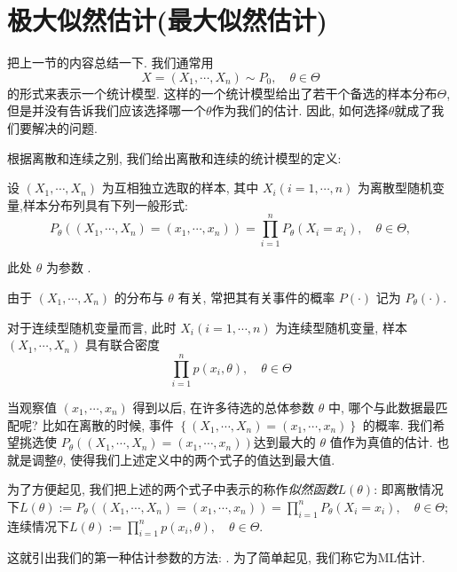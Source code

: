 \section{极大似然估计(最大似然估计)}

把上一节的内容总结一下. 我们通常用
$$
X=\left(X_1, \cdots, X_n\right) \sim P_0, \quad \theta \in \Theta
$$
的形式来表示一个统计模型. 这样的一个统计模型给出了若干个备选的样本分布$\Theta$, 但是并没有告诉我们应该选择哪一个$\theta$作为我们的估计. 因此, 如何选择$\theta$就成了我们要解决的问题. 

根据离散和连续之别, 我们给出离散和连续的统计模型的定义:

\begin{definition}
    \label{def:mle1}
    设 $\left(X_1, \cdots, X_n\right)$ 为互相独立选取的样本, 其中 $X_i(i=1, \cdots, n)$ 为离散型随机变量,样本分布列具有下列一般形式:
$$
P_\theta\left(\left(X_1, \cdots, X_n\right)=\left(x_1, \cdots, x_n\right)\right)=\prod_{i=1}^n P_\theta\left(X_i=x_i\right), \quad \theta \in \Theta,
$$

此处 $\theta$ 为参数 . 
\end{definition}

由于 $\left(X_1, \cdots, X_n\right)$ 的分布与 $\theta$ 有关, 常把其有关事件的概率 $P(\cdot)$ 记为 $P_\theta(\cdot)$.

\begin{definition}
    \label{def:mle2}
    对于连续型随机变量而言, 此时 $X_i(i=1, \cdots, n)$ 为连续型随机变量, 样本 $\left(X_1, \cdots, X_n\right)$ 具有联合密度
$$
\prod_{i=1}^n p\left(x_i, \theta\right), \quad \theta \in \Theta
$$
\end{definition}

当观察值 $\left(x_1, \cdots, x_n\right)$ 得到以后, 在许多待选的总体参数 $\theta$ 中, 哪个与此数据最匹配呢? 比如在离散的时候, 事件 $\left\{\left(X_1, \cdots, X_n\right)=\left(x_1, \cdots\right., \left.x_n\right)\right\}$ 的概率. 我们希望挑选使 $P_\theta\left(\left(X_1, \cdots, X_n\right)=\left(x_1, \cdots, x_n\right)\right)$达到最大的 $\theta$ 值作为真值的估计. 也就是调整$\theta$, 使得我们上述定义中的两个式子的值达到最大值. 

为了方便起见, 我们把上述的两个式子中表示的称作\emph{似然函数}$L(\theta)$: 即离散情况下$L(\theta):=P_\theta\left(\left(X_1, \cdots, X_n\right)=\left(x_1, \cdots, x_n\right)\right)=\prod_{i=1}^n P_\theta\left(X_i=x_i\right), \quad \theta \in \Theta;$连续情况下$L(\theta):=\prod_{i=1}^n p\left(x_i, \theta\right), \quad \theta \in \Theta$.

这就引出我们的第一种估计参数的方法: . 为了简单起见, 我们称它为ML估计. 

